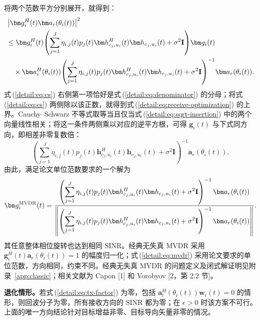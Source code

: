 将两个范数平方分别展开，就得到：
\begin{align}
&\left|\bm g_i^H(t)\bm a_r(\theta_i(t))\right|^2\notag\\
&\le\bm g_i^H(t)\!\left(\sum_{j=1}^J\eta_{i,j}(t)p_j(t)
\bm h_{c_j,u_i}^{H}(t)\bm h_{c_j,u_i}(t)+\sigma^2\mathbf I\right)\!\bm g_i(t)\notag\\
&\quad\times\bm a_r^H(\theta_i(t))\!\left(\sum_{j=1}^J\eta_{i,j}(t)p_j(t)
\bm h_{c_j,u_i}^{H}(t)\bm h_{c_j,u_i}(t)+\sigma^2\mathbf I\right)^{-1}\!\bm a_r(\theta_i(t)).\label{detail:eq:cs}
\end{align}
式\,(\ref{detail:eq:cs}) 右侧第一项恰好是式\,(\ref{detail:eq:denominator}) 的分母；将式\,(\ref{detail:eq:cs}) 两侧除以该正数，就得到式\,(\ref{detail:eq:receive-optimization}) 的上界。Cauchy--Schwarz 不等式取等当且仅当式\,(\ref{detail:eq:sqrt-insertion}) 中的两个向量线性相关；将这一条件两侧乘以对应的逆平方根，可得 $\bm g_i(t)$ 与下式同方向，即相差非零复数倍：
\begin{equation}\label{detail:eq:direction}
\left(\sum_{j=1}^J\eta_{i,j}(t)p_j(t)
\bm h_{c_j,u_i}^{H}(t)\bm h_{c_j,u_i}(t)+\sigma^2\mathbf I\right)^{-1}
\bm a_r(\theta_i(t)).
\end{equation}
由此，满足论文单位范数要求的一个解为
\begin{equation}\label{detail:eq:mvdr}
\bm g_i^{\rm MVDR}(t)=
\frac{\left(\displaystyle\sum_{j=1}^J\eta_{i,j}(t)p_j(t)
\bm h_{c_j,u_i}^{H}(t)\bm h_{c_j,u_i}(t)+\sigma^2\mathbf I\right)^{-1}
\bm a_r(\theta_i(t))}
{\left\|\left(\displaystyle\sum_{j=1}^J\eta_{i,j}(t)p_j(t)
\bm h_{c_j,u_i}^{H}(t)\bm h_{c_j,u_i}(t)+\sigma^2\mathbf I\right)^{-1}
\bm a_r(\theta_i(t))\right\|}.
\end{equation}
其任意整体相位旋转也达到相同 SINR。经典无失真 MVDR 采用 $\bm g_i^H(t)\bm a_r(\theta_i(t))=1$ 的幅度归一化；式\,(\ref{detail:eq:mvdr}) 采用论文要求的单位范数，方向相同，约束不同。经典无失真 MVDR 的问题定义及闭式解证明见附录~\ref{app:classic}；相关文献为 Capon [1] 和 Vorobyov [2，第 2.2 节]。

\textbf{退化情形。}若式\,(\ref{detail:eq:tx-factor}) 为零，包括 $\bm a_t^H(\theta_i(t))\bm w_i(t)=0$ 的情形，则回波分子为零，所有接收方向的 SINR 都为零；在 $\epsilon>0$ 时该方案不可行。上面的唯一方向结论针对目标增益非零、目标导向矢量非零的情况。


